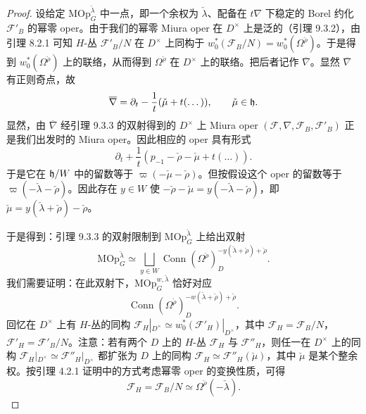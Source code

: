 \begin{proof}
设给定 $\mathrm{MOp}^{\check\lambda}_G$ 中一点，即一个余权为 $\check\lambda$、配备在 $t\nabla$ 下稳定的 Borel 约化 $\mathcal{F}'_B$ 的幂零 oper。由于我们的幂零 Miura oper 在 $D^\times$ 上是泛的（引理 9.3.2），由引理 8.2.1 可知 $H$-丛 $\mathcal{F}'_B/N$ 在 $D^\times$ 上同构于 $w_0^*(\mathcal{F}_B/N) = w_0^*(\Omega^{\check\rho})$。于是得到 $w_0^*(\Omega^{\check\rho})$ 上的联络，从而得到 $\Omega^{\check\rho}$ 在 $D^\times$ 上的联络。把后者记作 $\overline{\nabla}$。显然 $\overline{\nabla}$ 有正则奇点，故
\[
\overline{\nabla} = \partial_t - \frac{1}{t}(\check\mu+t(\dots)),\qquad \check\mu\in\mathfrak{h}.
\]
显然，由 $\overline{\nabla}$ 经引理 9.3.3 的双射得到的 $D^\times$ 上 Miura oper $(\mathcal{F},\nabla,\mathcal{F}_B,\mathcal{F}'_B)$ 正是我们出发时的 Miura oper。因此相应的 oper 具有形式
\[
\partial_t + \frac{1}{t}(p_{-1}-\check\rho-\check\mu+t(\dots)).
\]
于是它在 $\mathfrak{h}/W$ 中的留数等于 $\varpi(-\check\mu-\check\rho)$。但按假设这个 oper 的留数等于 $\varpi(-\check\lambda-\check\rho)$。因此存在 $y\in W$ 使 $-\check\rho-\check\mu = y(-\check\lambda-\check\rho)$，即 $\check\mu = y(\check\lambda+\check\rho)-\check\rho$。

于是得到：引理 9.3.3 的双射限制到 $\mathrm{MOp}^{\check\lambda}_G$ 上给出双射
\[
\mathrm{MOp}^{\check\lambda}_G\simeq\bigsqcup_{y\in W}\operatorname{Conn}(\Omega^{\check\rho})^{-y(\check\lambda+\check\rho)+\check\rho}_D.
\]
我们需要证明：在此双射下，$\mathrm{MOp}^{w,\check\lambda}_G$ 恰好对应
\[
\operatorname{Conn}(\Omega^{\check\rho})^{-w(\check\lambda+\check\rho)+\check\rho}_D.
\]
回忆在 $D^\times$ 上有 $H$-丛的同构 $\mathcal{F}_H|_{D^\times}\simeq w_0^*(\mathcal{F}'_H)|_{D^\times}$，其中 $\mathcal{F}_H = \mathcal{F}_B/N$，$\mathcal{F}'_H = \mathcal{F}'_B/N$。注意：若有两个 $D$ 上的 $H$-丛 $\mathcal{F}_H$ 与 $\mathcal{F}''_H$，则任一在 $D^\times$ 上的同构 $\mathcal{F}_H|_{D^\times}\simeq\mathcal{F}''_H|_{D^\times}$ 都扩张为 $D$ 上的同构 $\mathcal{F}_H\simeq\mathcal{F}''_H(\check\mu)$，其中 $\check\mu$ 是某个整余权。按引理 4.2.1 证明中的方式考虑幂零 oper 的变换性质，可得
\[
\mathcal{F}_H = \mathcal{F}_B/N\simeq\Omega^{\check\rho}(-\check\lambda).
\]


\end{proof}
